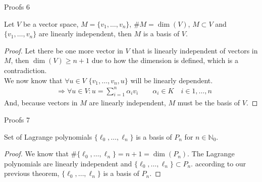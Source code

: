 \documentclass[8pt]{beamer}
\begin{document}
		\begin{frame}{Proofs 6}
			\begin{theorem}
				Let $V$ be a vector space, $M = \{v_1, \ldots, v_n\}$, $\# M = \dim(V)$, $M \subset V$ and $\{v_1, \ldots, v_n\}$ are linearly independent, then $M$ is a basis of $V$.
			\end{theorem}
			\begin{proof}
				Let there be one more vector in $V$ that is linearly independent of vectors in $M$, then $\dim(V) \geq n+1$ due to how the dimension is defined, which is a contradiction.\\ 
				We now know that $\forall u \in V$ $\{v_1, \ldots, v_n, u\}$ will be linearly dependent.
				\begin{align*}
					&\Rightarrow \forall u \in V: u = \sum_{i = 1}^{n}\alpha_i v_i \qquad \alpha_i \in K\quad i \in 1, \ldots, n
				\end{align*}
				And, because vectors in $M$ are linearly independent, $M$ must be the basis of $V$.
			\end{proof}
		\end{frame}
											
		\begin{frame}{Proofs 7}
			\begin{theorem}
				Set of Lagrange polynomials $\{\ell_0,\ldots, \ell_n\}$ is a basis of $P_n$ for $n \in \mathbb{N}_0$.
			\end{theorem}
			\begin{proof}
				We know that $\#\{\ell_0,\ldots, \ell_n\} = n+1 = \dim(P_n)$. The Lagrange polynomials are linearly independent and $\{\ell_0,\ldots, \ell_n\} \subset P_n$. according to our previous theorem, $\{\ell_0,\ldots, \ell_n\}$ is a basis of $P_n$.
			\end{proof}
		\end{frame}
		
\end{document}
